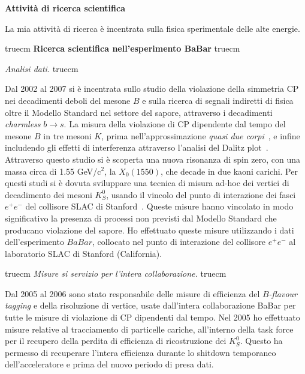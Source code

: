 \documentclass[11pt,twoside,a4paper]{article}
\begin{document}
\begin{center}
{\bf{Attivit\`a di ricerca scientifica}}
\end{center}

La mia attivit\`a di ricerca \`e incentrata sulla fisica sperimentale
delle alte energie.


 truecm
{\bf{Ricerca scientifica nell'esperimento BaBar}}
 truecm

\textit{Analisi dati.}
 truecm

Dal 2002 al 2007 si \`e incentrata sullo studio della violazione della
simmetria CP nei decadimenti deboli del mesone $B$ e sulla ricerca di
segnali indiretti di fisica oltre il Modello Standard nel settore del
sapore, attraverso i decadimenti \textit{charmless} $b \to s$.  La
misura della violazione di CP dipendente dal tempo del mesone $B$ in
tre mesoni $K$, prima nell'approssimazione \textit{quasi due
  corpi}~\cite{Aubert:2008rr}, e infine includendo gli effetti di
interferenza attraverso l'analisi del Dalitz
plot~\cite{Aubert:2007sd,Aubert:2007me}. Attraverso questo studio si
\`e scoperta una nuova risonanza di spin zero, con una massa circa di
1.55 GeV/c$^2$, la $X_0(1550)$, che decade in due kaoni carichi. Per
questi studi si \`e dovuta sviluppare una tecnica di misura ad-hoc dei
vertici di decadimento dei mesoni $K^0_S$, usando il vincolo del punto
di interazione dei fasci $e^+e^-$ del collisore SLAC di
Stanford~\cite{Aubert:2005dy,Aubert:2005gj}.  Queste misure hanno
vincolato in modo significativo la presenza di processi non previsti
dal Modello Standard che producano violazione del sapore.  Ho
effettuato queste misure utilizzando i dati dell'esperimento $BaBar$,
collocato nel punto di interazione del collisore $e^+e^-$ al
laboratorio SLAC di Stanford (California).

 truecm
\textit{Misure si servizio per l'intera collaborazione.}
 truecm

Dal 2005 al 2006 sono stato responsabile delle misure di efficienza
del \textit{$B$-flavour tagging} e della risoluzione di vertice, usate
dall'intera collaborazione BaBar per tutte le misure di violazione di
CP dipendenti dal tempo. Nel 2005 ho effettuato misure relative al
tracciamento di particelle cariche, all'interno della task force per
il recupero della perdita di efficienza di ricostruzione dei
$K^0_S$. Questo ha permesso di recuperare l'intera efficienza durante
lo shitdown temporaneo dell'acceleratore e prima del nuovo periodo di
presa dati.
\end{document}
